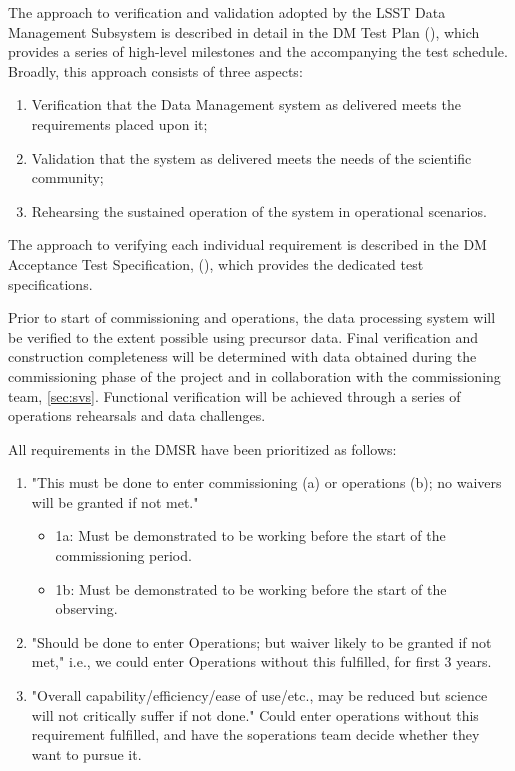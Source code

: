 The approach to verification and validation adopted by the LSST Data Management Subsystem is described in detail in the DM Test Plan (), which provides a series of high-level milestones and the accompanying the test schedule. 
Broadly, this approach consists of three aspects:
\begin{enumerate}
	\item Verification that the Data Management system as delivered meets the requirements placed upon it;
	\item Validation that the system as delivered meets the needs of the scientific community;
	\item Rehearsing the sustained operation of the system in operational scenarios.
\end{enumerate}
The approach to verifying each individual requirement is described in the DM Acceptance Test Specification, (), which provides the dedicated test specifications. 

Prior to start of commissioning and operations, the data processing system will be verified to the extent possible using precursor data. 
Final verification and construction completeness will be determined with data obtained during the commissioning phase of the project and in collaboration with the commissioning team, \ref{sec:svs}.  
Functional verification will be achieved through a series of operations rehearsals and data challenges.  

All requirements in the DMSR have been prioritized as follows: 
\begin{enumerate}
	\item "This must be done to enter commissioning (a) or operations (b); no waivers will be granted if not met."
		\begin{itemize}
			\item 1a: Must be demonstrated to be working before the start of the commissioning period.
			\item1b: Must be demonstrated to be working before the start of the observing.
		\end{itemize}
	\item  "Should be done to enter Operations; but waiver likely to be granted if not met," i.e., we could enter Operations without this fulfilled, for first 3 years.
	\item  "Overall capability/efficiency/ease of use/etc., may be reduced but science will not critically suffer if not done." Could enter operations without this requirement fulfilled, and have the soperations team decide whether they want to pursue it.
\end{enumerate}
 
